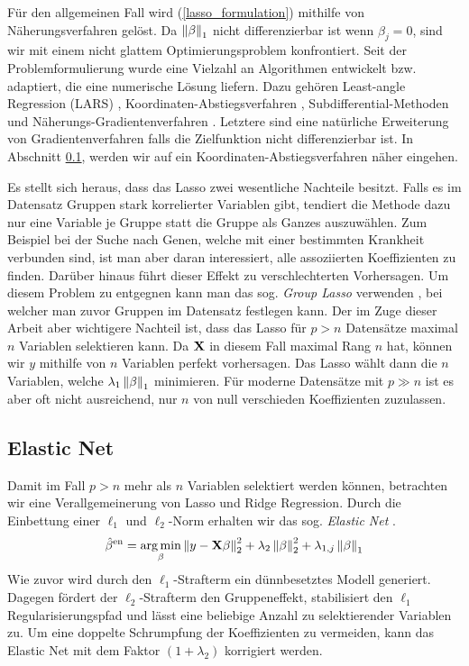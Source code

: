 Für den allgemeinen Fall wird (\ref{lasso_formulation}) mithilfe von Näherungsverfahren gelöst. Da $\left\lVert \beta \right\rVert_1$ nicht differenzierbar ist wenn $\beta_j = 0$, sind wir mit einem nicht glattem Optimierungsproblem konfrontiert. Seit der Problemformulierung wurde eine Vielzahl an Algorithmen entwickelt bzw. adaptiert, die eine numerische Lösung liefern. Dazu gehören Least-angle Regression (LARS) \cite{efron_lars}, Koordinaten-Abstiegsverfahren \cite{friedman}, Subdifferential-Methoden und  Näherungs-Gradientenverfahren \cite{yang, vandenberghe}. Letztere sind eine natürliche Erweiterung von Gradientenverfahren falls die Zielfunktion nicht differenzierbar ist. In Abschnitt \ref{elastic_net}, werden wir auf ein Koordinaten-Abstiegsverfahren näher eingehen.

Es stellt sich heraus, dass das Lasso zwei wesentliche Nachteile besitzt. Falls es im Datensatz Gruppen stark korrelierter Variablen gibt, tendiert die Methode dazu nur eine Variable je Gruppe statt die Gruppe als Ganzes auszuwählen. Zum Beispiel bei der Suche nach Genen, welche mit einer bestimmten Krankheit verbunden sind, ist man aber daran interessiert, alle assoziierten Koeffizienten zu finden. Darüber hinaus führt dieser Effekt zu verschlechterten Vorhersagen. Um diesem Problem zu entgegnen kann man das sog. \textit{Group Lasso} verwenden \cite{yuan}, bei welcher man zuvor Gruppen im Datensatz festlegen kann. Der im Zuge dieser Arbeit aber wichtigere Nachteil ist, dass das Lasso für $p > n$ Datensätze maximal $n$ Variablen selektieren kann. Da $\mathbf{X}$ in diesem Fall maximal Rang $n$ hat, können wir $y$ mithilfe von $n$ Variablen perfekt vorhersagen. Das Lasso wählt dann die $n$ Variablen, welche $\lambda_1\left\lVert \beta \right\rVert_1$ minimieren. Für moderne Datensätze mit $p \gg n$ ist es aber oft nicht ausreichend, nur $n$ von null verschieden Koeffizienten zuzulassen.

\subsection{Elastic Net}
\label{elastic_net}

Damit im Fall $p > n$ mehr als $n$ Variablen selektiert werden können, betrachten wir eine Verallgemeinerung von Lasso und Ridge Regression. Durch die Einbettung einer $\ell_1$ und $\ell_2$-Norm erhalten wir das sog. \textit{Elastic Net} \cite{zou_elasticnet}.
\begin{align}
\label{elastic_net_formulation}
\hat{\beta}^{\text{en}} = \operatorname*{arg\,min}_{\beta} \left\lVert y - \mathbf{X} \beta \right\rVert_2^2 + \lambda_2 \left\lVert \beta \right\rVert_{2}^{2} + \lambda_{1,j} \left\lVert \beta \right\rVert_{1}
\end{align}
Wie zuvor wird durch den $\ell_1$-Strafterm ein dünnbesetztes Modell generiert. Dagegen fördert der $\ell_2$-Strafterm den Gruppeneffekt, stabilisiert den $\ell_1$ Regularisierungspfad und lässt eine beliebige Anzahl zu selektierender Variablen zu. Um eine doppelte Schrumpfung der Koeffizienten zu vermeiden, kann das Elastic Net mit dem Faktor $(1 + \lambda_2)$ korrigiert werden. 

